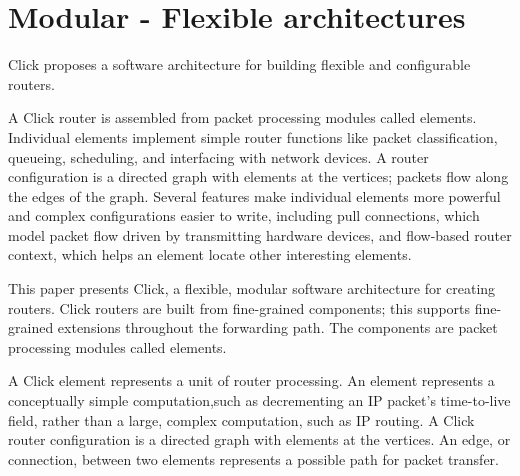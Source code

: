 



\section{Modular - Flexible architectures}



Click \cite{kohler:click} proposes a software architecture for building flexible and configurable routers.

A Click router is assembled from packet processing modules called elements.
Individual elements implement simple router functions like packet classification, queueing, scheduling, and interfacing with network devices.
A router configuration is a directed graph with elements at the vertices;
packets flow along the edges of the graph.
Several features make individual elements more powerful and complex configurations easier to write, including pull connections,
which model packet flow driven by transmitting hardware devices, and flow-based router context, which helps an element locate other interesting elements.

This paper presents Click, a flexible, modular software architecture for creating routers.
Click routers are built from fine-grained components;
this supports fine-grained extensions throughout the forwarding path.
The components are packet processing modules called elements.

A Click element represents a unit of router processing.
An element represents a conceptually simple computation,such as decrementing an IP packet’s time-to-live field,
rather than a large, complex computation, such as IP routing.
A Click router configuration is a directed graph with elements at the vertices.
An edge, or connection, between two elements represents a possible path for packet transfer.

% 
% 


